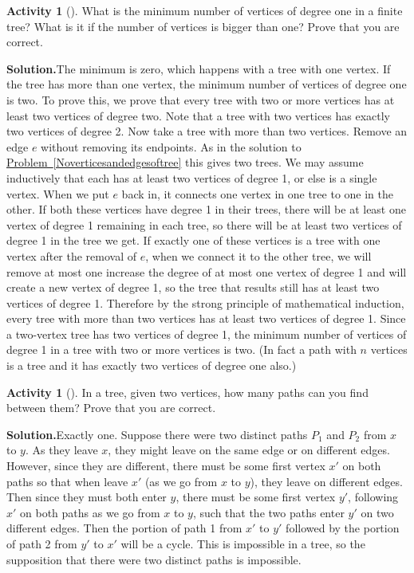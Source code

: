 \documentclass[10pt,]{book}
\theoremstyle{plain}
\theoremstyle{definition}
\newtheorem{activity}[project]{Activity}
\numberwithin{equation}{chapter}
\begin{document}
\begin{activity}[]\label{activity-50}
What is the minimum number of vertices of degree one in a finite tree? What is it if the number of vertices is bigger than one? Prove that you are correct.%
\par\medskip\noindent%
\textbf{Solution.}\quad The minimum is zero, which happens with a tree with one vertex. If the tree has more than one vertex, the minimum number of vertices of degree one is two. To prove this, we prove that every tree with two or more vertices has at least two vertices of degree two. Note that a tree with two vertices has exactly two vertices of degree 2. Now take a tree with more than two vertices. Remove an edge \(e\) without removing its endpoints. As in the solution to \hyperref[Noverticesandedgesoftree]{Problem~\ref{Noverticesandedgesoftree}} this gives two trees. We may assume inductively that each has at least two vertices of degree 1, or else is a single vertex. When we put \(e\) back in, it connects one vertex in one tree to one in the other. If both these vertices have degree 1 in their trees, there will be at least one vertex of degree 1 remaining in each tree, so there will be at least two vertices of degree 1 in the tree we get. If exactly one of these vertices is a tree with one vertex after the removal of \(e\), when we connect it to the other tree, we will remove at most one increase the degree of at most one vertex of degree 1 and will create a new vertex of degree 1, so the tree that results still has at least two vertices of degree 1. Therefore by the strong principle of mathematical induction, every tree with more than two vertices has at least two vertices of degree 1. Since a two-vertex tree has two vertices of degree 1, the minimum number of vertices of degree 1 in a tree with two or more vertices is two. (In fact a path with \(n\) vertices is a tree and it has exactly two vertices of degree one also.)%
\end{activity}
\begin{activity}[]\label{activity-51}
In a tree, given two vertices, how many paths can you find between them? Prove that you are correct.%
\par\medskip\noindent%
\textbf{Solution.}\quad Exactly one. Suppose there were two distinct paths \(P_1\) and \(P_2\) from \(x\) to \(y\). As they leave \(x\), they might leave on the same edge or on different edges. However, since they are different, there must be some first vertex \(x'\) on both paths so that when leave \(x'\) (as we go from \(x\) to \(y\)), they leave on different edges. Then since they must both enter \(y\), there must be some first vertex \(y'\), following \(x'\) on both paths as we go from \(x\) to \(y\), such that the two paths enter \(y'\) on two different edges. Then the portion of path 1 from \(x'\) to \(y'\) followed by the portion of path 2 from \(y'\) to \(x'\) will be a cycle. This is impossible in a tree, so the supposition that there were two distinct paths is impossible.%
\end{activity}
\end{document}
